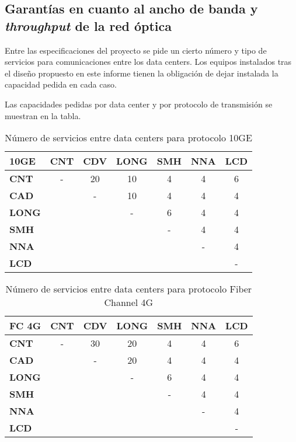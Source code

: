 \subsection{Garantías en cuanto al ancho de banda y \emph{throughput}
  de la red óptica}
\label{sec:anchodebanda}

Entre las especificaciones del proyecto se pide un cierto número y
tipo de servicios para comunicaciones entre los data centers. Los
equipos instalados tras el diseño propuesto en este informe tienen la
obligación de dejar instalada la capacidad pedida en cada caso.

Las capacidades pedidas por data center y por protocolo de
transmisión se muestran en la tabla.

\begin{table}[H]
  \centering
  \begin{tabular}{| l | c | c | c | c | c | c |}
    \hline
    \textbf{10GE} & \textbf{CNT} & \textbf{CDV} & \textbf{LONG} & \textbf{SMH} & \textbf{NNA} & \textbf{LCD} \\
    \hline
    \textbf{CNT}  & - & 20 & 10 & 4 & 4 & 6 \\
    \hline
    \textbf{CAD}  &   & - & 10 & 4 & 4 & 4 \\
    \hline
    \textbf{LONG} &   &   & - & 6 & 4 & 4 \\
    \hline
    \textbf{SMH}  &   &   &   & - & 4 & 4 \\
    \hline
    \textbf{NNA}  &   &   &   &   & - & 4 \\
    \hline
    \textbf{LCD}  &   &   &   &   &   & - \\
    \hline
  \end{tabular}
  \caption{Número de servicios entre data centers para protocolo 10GE}
  \label{tab:10ge}
\end{table}

 \begin{table}[H]
   \centering
   \begin{tabular}{| l | c | c | c | c | c | c |}
     \hline
     \textbf{FC 4G} & \textbf{CNT} & \textbf{CDV} & \textbf{LONG} & \textbf{SMH} & \textbf{NNA} & \textbf{LCD} \\
     \hline
     \textbf{CNT}  & - & 30 & 20 & 4 & 4 & 6 \\
     \hline
     \textbf{CAD}  &   & - & 20 & 4 & 4 & 4 \\
     \hline
     \textbf{LONG} &   &   & - & 6 & 4 & 4 \\
     \hline
     \textbf{SMH}  &   &   &   & - & 4 & 4 \\
     \hline
     \textbf{NNA}  &   &   &   &   & - & 4 \\
     \hline
     \textbf{LCD}  &   &   &   &   &   & - \\
     \hline
   \end{tabular}
   \caption{Número de servicios entre data centers para protocolo Fiber Channel 4G}
   \label{tab:FC4G}
 \end{table}
